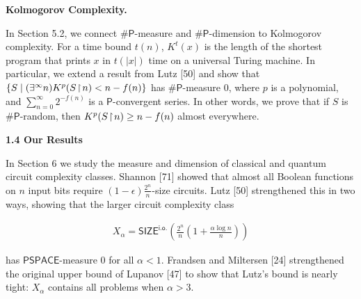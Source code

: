 \par\medskip\noindent\textbf{Kolmogorov Complexity.}\par




In Section 5.2, we connect
${\mathsf{\#}\mathsf{P}}$-measure and ${\mathsf{\#}\mathsf{P}}$-dimension to Kolmogorov complexity. For a time bound $t(n)$, $K^{t}(x)$ is the length of the shortest program that prints $x$ in $t(|x|)$ time on a universal Turing machine. In particular, we extend a result from Lutz [50] and show that $\{S\mid(\exists^{\infty}n)K^{p}(S\negthinspace\upharpoonright\negthinspace n)<n-f(n)\}$ has ${\mathsf{\#}\mathsf{P}}$-measure 0, where $p$ is a polynomial, and $\sum_{n=0}^{\infty}2^{-f(n)}$ is a $\mathsf{P}$-convergent series. In other words, we prove that if $S$ is ${\mathsf{\#}\mathsf{P}}$-random, then $K^{p}(S\negthinspace\upharpoonright\negthinspace n)\geq n-f(n)$ almost everywhere.\par






\par\medskip\noindent\textbf{
1.4 Our Results}\par




In Section 6 we study the measure and dimension of classical and quantum circuit complexity classes.
Shannon [71] showed that almost all Boolean functions on $n$ input bits require $(1-\epsilon)\frac{2^{n}}{n}$-size circuits.
Lutz [50] strengthened this in two ways,
showing that the larger circuit complexity class\par


\[\begin{gathered}
X_{\alpha}=\mathsf{SIZE}^{\mathsf{i.o.}}\!\!\left(\frac{2^{n}}{n}\left(1+\frac{\alpha\log n}{n}\right)\right)
\end{gathered}\]


has $\mathsf{PSPACE}$-measure 0 for all $\alpha<1$.
Frandsen and Miltersen [24] strengthened the original upper bound of Lupanov [47] to show that Lutz’s bound is nearly tight: $X_{\alpha}$ contains all problems when $\alpha>3$.\par





